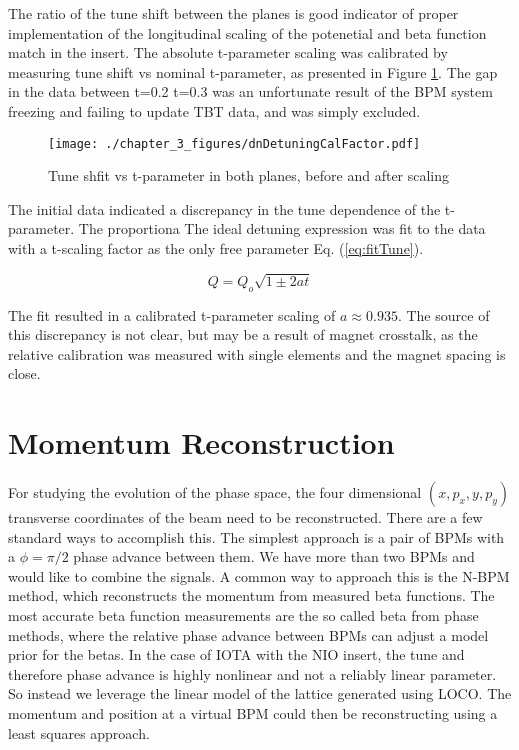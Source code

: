 The ratio of the tune shift between the planes is good indicator of proper implementation of the longitudinal scaling of the potenetial and beta function match in the insert. The absolute t-parameter scaling was calibrated by measuring tune shift vs nominal t-parameter, as presented in Figure \ref{fig:dnTuneVsT}. The gap in the data between t=0.2 t=0.3 was an unfortunate result of the BPM system freezing and failing to update TBT data, and was simply excluded.

\begin{figure}
    \centering
    \texttt{[image: ./chapter\_3\_figures/dnDetuningCalFactor.pdf]}
    \caption{Tune shfit vs t-parameter in both planes, before and after scaling}
    \label{fig:dnTuneVsT}
\end{figure}

The initial data indicated a discrepancy in the tune dependence of the t-parameter. The proportiona The ideal detuning expression was fit to the data with a t-scaling factor as the only free parameter Eq. (\ref{eq:fitTune}). 

\begin{equation}
    Q = Q_o \sqrt{1\pm 2at}
    \label{eq:fitTune}
\end{equation}

The fit resulted in a calibrated t-parameter scaling of $a \approx 0.935$. The source of this discrepancy is not clear, but may be a result of magnet crosstalk, as the relative calibration was measured with single elements and the magnet spacing is close.

\section{Momentum Reconstruction} \label{sec:momReconst}
For studying the evolution of the phase space, the four dimensional $(x,p_x,y,p_y)$ transverse coordinates of the beam need to be reconstructed. There are a few standard ways to accomplish this. The simplest approach is a pair of BPMs with a $\phi = \pi/2$ phase advance between them. We have more than two BPMs and would like to combine the signals. A common way to approach this is the N-BPM method, which reconstructs the momentum from measured beta functions. The most accurate beta function measurements are the so called beta from phase methods, where the relative phase advance between BPMs can adjust a model prior for the betas. In the case of IOTA with the NIO insert, the tune and therefore phase advance is highly nonlinear and not a reliably linear parameter. So instead we leverage the linear model of the lattice generated using LOCO. The momentum and position at a virtual BPM could then be reconstructing using a least squares approach. 

